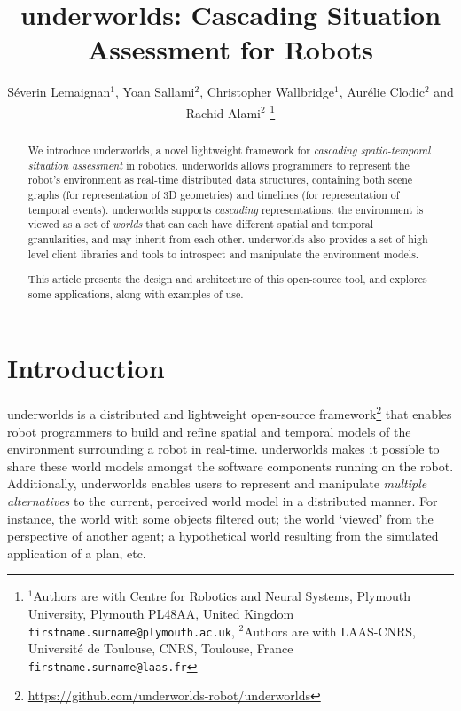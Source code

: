 \documentclass[letterpaper, 10pt, conference]{ieeeconf}
\newcommand{\uwds}{{\sc underworlds}\xspace}
\begin{document}
\title{\LARGE \bf
{\sc underworlds}: Cascading Situation Assessment for Robots
}


\author{Séverin Lemaignan$^{1}$, Yoan Sallami$^{2}$, Christopher Wallbridge$^{1}$, Aurélie Clodic$^{2}$ and Rachid Alami$^{2}$%
\thanks{$^{1}$Authors are with Centre for Robotics and Neural Systems,
        Plymouth University, Plymouth PL48AA, United Kingdom
        {\tt\small firstname.surname@plymouth.ac.uk},
	$^{2}$Authors are with LAAS-CNRS, Université de Toulouse, CNRS, Toulouse, France
        {\tt\small firstname.surname@laas.fr}}%
}




\maketitle
\thispagestyle{empty}
\pagestyle{empty}

\begin{abstract}

    We introduce \uwds, a novel lightweight framework for \emph{cascading
    spatio-temporal situation assessment} in robotics. \uwds allows programmers
    to represent the robot's environment as real-time distributed data
    structures, containing both scene graphs (for representation of 3D
    geometries) and timelines (for representation of temporal events). \uwds
    supports \emph{cascading} representations: the environment is viewed as a
    set of \emph{worlds} that can each have different spatial and temporal
    granularities, and may inherit from each other.  \uwds also provides a set of
    high-level client libraries and tools to introspect and manipulate the
    environment models.

    This article presents the design and architecture of this open-source tool,
    and explores some applications, along with examples of use.

\end{abstract}


\section{Introduction}


\uwds is a distributed and lightweight open-source
framework\footnote{\url{https://github.com/underworlds-robot/underworlds}} that
enables robot programmers to build and refine spatial and temporal
models of the environment surrounding a robot in real-time. \uwds makes it possible to share
these world models amongst the software components running on the robot.
Additionally, \uwds enables users to represent and manipulate
\emph{multiple alternatives} to the current, perceived world model in a distributed manner. For
instance, the world with some objects filtered out; the world `viewed' from the
perspective of another agent; a hypothetical world resulting from the simulated
application of a plan, etc.
\end{document}
